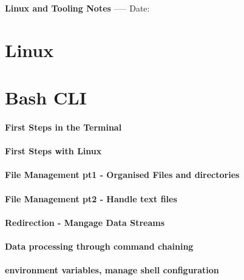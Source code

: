 \documentclass[a4paper, 11pt]{book}
\begin{document}
    \begin{titlepage}
        \centering
        \vspace*{2in}
        \Huge \textbf{Linux and Tooling Notes}
        \vfill
        \Large -----
        \vfill
        \Large Date:%
    \end{titlepage}

    \tableofcontents
    \newpage


    \chapter{Linux}



    \chapter{Bash CLI}

    \subsubsection{First Steps in the Terminal}

    \subsubsection{First Steps with Linux}

    \subsubsection{File Management pt1 - Organised Files and directories}

    \subsubsection{File Management pt2 - Handle text files}

    \subsubsection{Redirection - Mangage Data Streams}

    \subsubsection{Data processing through command chaining}

    \subsubsection{environment variables, manage shell configuration}
\end{document}

